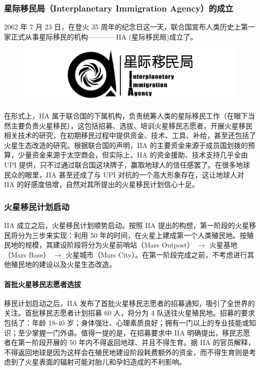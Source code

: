 \documentclass[letterpaper,10pt]{sphinxmanual}
\begin{document}

\subsubsection{星际移民局（Interplanetary Immigration Agency）的成立}
\label{history:interplanetary-immigration-agency}\label{history:index-37}
2062 年 7 月 23 日，在登火 35 周年的纪念日这一天，联合国宣布人类历史上第一家正式从事星际移民的机构————IIA (星际移民局)成立了。
\begin{figure}[htbp]
\centering

\includegraphics{InterImm_banner_white_1720X430.png}
\end{figure}

在形式上，IIA 属于联合国的下属机构，负责统筹人类的星际移民工作（在眼下当然主要负责火星移民），这包括招募、选拔、培训火星移民志愿者，开展火星移民相关技术的研究，在初期移民过程中提供资金、技术、工具、补给，甚至还包括了火星生态改造的研究。根据联合国的声明，IIA 的主要资金来源于成员国划拨的预算，少量资金来源于太空商会，但实际上，IIA 的资金援助、技术支持几乎全由 UPI 提供，只不过通过联合国这块牌子，赢取地球人的信任感罢了。在很多地球民众的眼里，IIA 甚至还成了与 UPI 对抗的一个高大形象存在，这让地球人对 IIA 的好感度倍增，自然对其所提出的火星移民计划信心十足。


\subsubsection{火星移民计划启动}
\label{history:id15}
IIA 成立之后，火星移民计划顺势启动。按照 IIA 提出的构想，第一阶段的火星移民将分为三步来实现：利用 50 年的时间，在火星上建成第一个人类殖民地。按殖民地的规模，其建设阶段将分为火星前哨站（Mars Outpost） \(\rightarrow\) 火星基地（Mars Base） \(\rightarrow\) 火星城市（Mars City）。在第一阶段完成之前，不考虑进行其他殖民地的建设以及火星生态改造。


\paragraph{首批火星移民志愿者选拔}
\label{history:id16}
移民计划启动之后，IIA 发布了首批火星移民志愿者的招募通知，吸引了全世界的关注。首批移民志愿者计划招募 60 人，将分为 4 队送往火星殖民地。招募的要求包括了：年龄 18-40 岁；身体强壮、心理素质良好；拥有一门以上的专业技能或知识；至少掌握一门外语。值得一提的是，在招募要求中 IIA 明确提出，移民志愿者在第一阶段开展的 50 年内不得返回地球、并且不得生育。据 IIA 的官员解释，不得返回地球是因为这样会在殖民地建设阶段耗费额外的资金，而不得生育则是考虑到了火星表面的辐射可能对胎儿和孕妇造成的不利影响。
\end{document}
